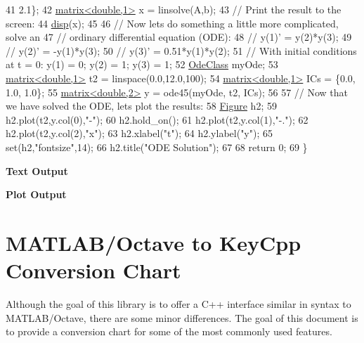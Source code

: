 \begin{DoxyCodeInclude}
41                           2.1\};
42     \hyperlink{classkeycpp_1_1matrix}{matrix<double,1>} x = linsolve(A,b);
43     \textcolor{comment}{// Print the result to the screen:}
44     \hyperlink{namespacekeycpp_af4a2245da139cf6cf2e03426476b3b88}{disp}(x);
45 
46     \textcolor{comment}{// Now lets do something a little more complicated, solve an}
47     \textcolor{comment}{// ordinary differential equation (ODE):}
48     \textcolor{comment}{// y(1)' = y(2)*y(3);}
49     \textcolor{comment}{// y(2)' = -y(1)*y(3);}
50     \textcolor{comment}{// y(3)' = 0.51*y(1)*y(2);}
51     \textcolor{comment}{// With initial conditions at t = 0: y(1) = 0; y(2) = 1; y(3) = 1;}
52     \hyperlink{class_ode_class}{OdeClass} myOde;
53     \hyperlink{classkeycpp_1_1matrix}{matrix<double,1>} t2 = linspace(0.0,12.0,100);
54     \hyperlink{classkeycpp_1_1matrix}{matrix<double,1>} ICs = \{0.0, 1.0, 1.0\};
55     \hyperlink{classkeycpp_1_1matrix}{matrix<double,2>} y = ode45(myOde, t2, ICs);
56     
57     \textcolor{comment}{// Now that we have solved the ODE, lets plot the results:}
58     \hyperlink{classkeycpp_1_1_figure}{Figure} h2;
59     h2.plot(t2,y.col(0),\textcolor{stringliteral}{"-"});
60     h2.hold\_on();
61     h2.plot(t2,y.col(1),\textcolor{stringliteral}{"-."});
62     h2.plot(t2,y.col(2),\textcolor{stringliteral}{"x"});
63     h2.xlabel(\textcolor{stringliteral}{"t"});
64     h2.ylabel(\textcolor{stringliteral}{"y"});
65     set(h2,\textcolor{stringliteral}{"fontsize"},14);
66     h2.title(\textcolor{stringliteral}{"ODE Solution"});
67 
68     \textcolor{keywordflow}{return} 0;
69 \}
\end{DoxyCodeInclude}
 \par
 \label{_output}%
 {\bfseries {\ttfamily Text} Output} 
\begin{DoxyCodeInclude}
\end{DoxyCodeInclude}
 \par
 {\bfseries {\ttfamily Plot} Output}  \par
  \par


\section*{M\-A\-T\-L\-A\-B/\-Octave to Key\-Cpp Conversion Chart}

Although the goal of this library is to offer a C++ interface similar in syntax to M\-A\-T\-L\-A\-B/\-Octave, there are some minor differences. The goal of this document is to provide a conversion chart for some of the most commonly used features.

